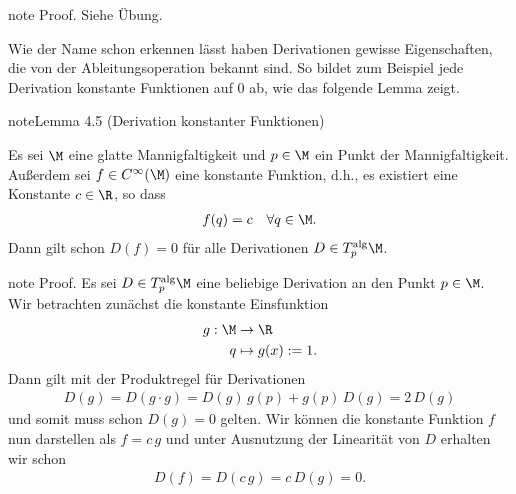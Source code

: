 \documentclass[letterpaper,10pt,english]{jupyterBook}
\begin{document}
\begin{sphinxadmonition}{note}
\sphinxAtStartPar
Proof. Siehe Übung.
\end{sphinxadmonition}

\sphinxAtStartPar
Wie der Name schon erkennen lässt haben Derivationen gewisse Eigenschaften, die von der Ableitungsoperation bekannt sind.
So bildet zum Beispiel jede Derivation konstante Funktionen auf \(0\) ab, wie das folgende Lemma zeigt.
\label{manifolds/tangential:lem:constder}
\begin{sphinxadmonition}{note}{Lemma 4.5 (Derivation konstanter Funktionen)}



\sphinxAtStartPar
Es sei \(\M\) eine glatte Mannigfaltigkeit und \(p\in\M\) ein Punkt der Mannigfaltigkeit.
Außerdem sei \(f\in C^\infty(\M)\) eine konstante Funktion, d.h., es existiert eine Konstante \(c\in\R\), so dass
\begin{equation*}
\begin{split}f(q) = c\quad\forall q\in\M.\end{split}
\end{equation*}
\sphinxAtStartPar
Dann gilt schon \(D(f)=0\) für alle Derivationen \(D\in T^{\text{alg}}_p\M\).
\end{sphinxadmonition}

\begin{sphinxadmonition}{note}
\sphinxAtStartPar
Proof. Es sei \(D\in T^{\text{alg}}_p\M\) eine beliebige Derivation an den Punkt \(p \in \M\).
Wir betrachten zunächst die konstante Einsfunktion
\begin{equation*}
\begin{split}g:\M &\to \R\\
q &\mapsto g(x) := 1.\end{split}
\end{equation*}
\sphinxAtStartPar
Dann gilt mit der Produktregel für Derivationen
\begin{equation*}
\begin{split}D(g) = D(g\cdot g) = D(g)\,g(p) + g(p)\, D(g) = 2\,D(g)\end{split}
\end{equation*}
\sphinxAtStartPar
und somit muss schon \(D(g) = 0\) gelten.
Wir können die konstante Funktion \(f\) nun darstellen als \(f= c\,g\) und unter Ausnutzung der Linearität von \(D\) erhalten wir schon
\begin{equation*}
\begin{split}D(f) = D(c\,g) = c\,D(g) = 0.\end{split}
\end{equation*}\end{sphinxadmonition}
\end{document}
